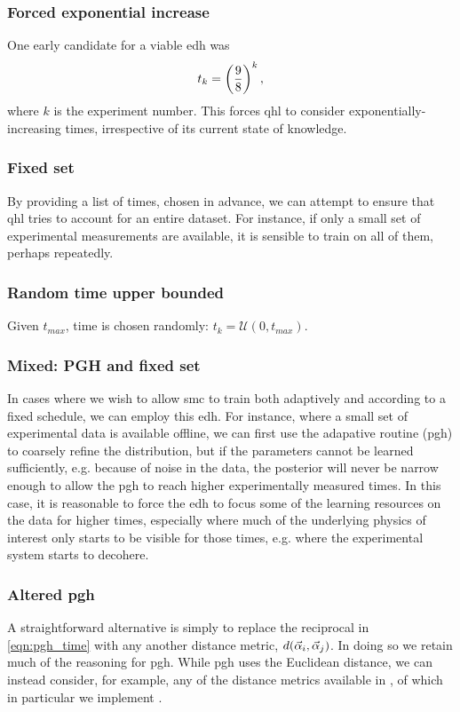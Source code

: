\subsubsection{Forced exponential increase}
One early candidate for a viable \gls{edh} was 
\begin{equation}
    t_k = \left(\frac{9}{8}\right)^k, 
\end{equation}
    where $k$ is the experiment number. 
This forces \gls{qhl} to consider exponentially-increasing times, irrespective of its current state of knowledge. 

\subsubsection{Fixed set}
By providing a list of times, chosen in advance, we can attempt to ensure that \gls{qhl} tries to account for 
    an entire dataset. 
For instance, if only a small set of experimental measurements are available, 
    it is sensible to train on all of them, perhaps repeatedly. 

\subsubsection{Random time upper bounded}
    Given $t_{max}$, time is chosen randomly: $t_k = \mathcal{U}(0, t_{max})$. 
    
\subsubsection{Mixed: PGH and fixed set}
In cases where we wish to allow \gls{smc} to train both adaptively and according to a fixed schedule,
    we can employ this \gls{edh}. 
For instance, where a small set of experimental data is available offline, 
    we can first use the adapative routine (\gls{pgh}) to coarsely refine the distribution, 
    but if the parameters cannot be learned sufficiently, e.g. because of noise in the data, 
    the posterior will never be narrow enough to allow the \gls{pgh} to reach higher 
    experimentally measured times. 
In this case, it is reasonable to force the \gls{edh} to focus some of the learning 
    resources on the data for higher times, 
    especially where much of the underlying physics of interest only starts to be visible for those times, 
    e.g. where the experimental system starts to decohere. 

\subsubsection{Altered \gls{pgh}}
A straightforward alternative is simply to replace the reciprocal in \cref{eqn:pgh_time} with any another distance metric, 
    $d(\vec{\alpha}_i, \vec{\alpha}_j)$.
In doing so we retain much of the reasoning for \gls{pgh}. 
While \gls{pgh} uses the Euclidean distance, we can instead consider, for example, 
    any of the distance metrics available in  \cite{2020SciPy-NMeth}, 
    of which in particular we implement . 
        
